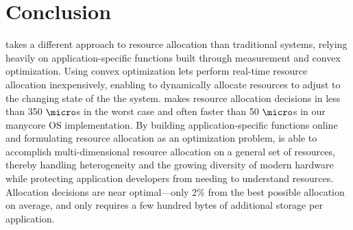 \section{Conclusion}\label{conclusion}

\pacora takes a different approach to resource allocation than traditional systems, relying heavily on application-specific functions built through measurement and convex optimization.  Using convex optimization lets \pacora perform real-time resource allocation inexpensively, enabling \pacora to dynamically allocate resources to adjust to the changing state of the the system.  \pacora makes resource allocation decisions in less than 350 $\micro$s in the worst case and often faster than 50 $\micro$s in our manycore OS implementation. By building application-specific functions online and formulating resource allocation as an optimization problem, \pacora is able to accomplish multi-dimensional resource allocation on a general set of resources, thereby handling heterogeneity and the growing diversity of modern hardware while protecting application developers from needing to understand resources. Allocation decisions are near optimal---only 2\% from the best possible allocation on average, and \pacora only requires a few hundred bytes of additional storage per application. 






